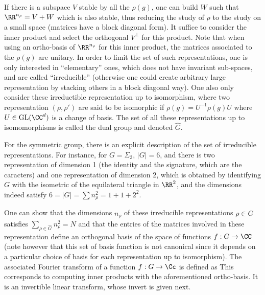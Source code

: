 If there is a subspace $V$ stable by all the $\rho(g)$, one can build $W$ such that $\RR^{n_\rho}=V+W$ which is also stable, thus reducing the study of $\rho$ to the study on a small space (matrices have a block diagonal form). It suffice to consider the inner product
and select the orthogonal $V^\bot$ for this product. Note that when using an ortho-basis of $\RR^{n_\rho}$ for this inner product, the matrices associated to the $\rho(g)$ are unitary.
%
In order to limit the set of such representations, one is only interested in ``elementary'' ones, which does not have invariant sub-spaces, and are called ``irreducible'' (otherwise one could create arbitrary large representation by stacking others in a block diagonal way). 
%
One also only consider these irreductible representation up to isomorphism, where two representation $(\rho,\rho')$ are said to be isomorphic if $\rho(g) = U^{-1} \rho(g) U$ where $U \in \text{GL}(\CC^d)$ is a change of basis. The set of all these representations up to isomomorphisms is called the dual group and denoted $\hat G$.

For the symmetric group, there is an explicit description of the set of irreducible representations.  
%
For instance, for $G=\Sigma_3$, $|G|=6$, and there is two representation of dimension 1 (the identity and the signature, which are the caracters) and one representation of dimension 2, which is obtained by identifying $G$ with the isometric of the equilateral triangle in $\RR^2$, and the dimensions indeed satisfy $6 = |G| = \sum n_\rho^2 = 1+1+2^2$. 

One can show that the dimensions $n_\rho$ of these irreducible representations $\rho \in \hat G$ satisfies $\sum_{\rho \in \hat G} n_\rho^2 = N$ and that the entries of the matrices involved in these representation define an orthogonal basis of the space of functions $f : G \rightarrow \CC$ (note however that this set of basis function is not canonical since it depends on a particular choice of basis for each representation up to isomorphism).
%
The associated Fourier transform of a function $f : G \rightarrow \Cc$ is defined as
This corresponds to computing inner products with the aforementioned ortho-basis.
%
It is an invertible linear transform, whose invert is given next.

